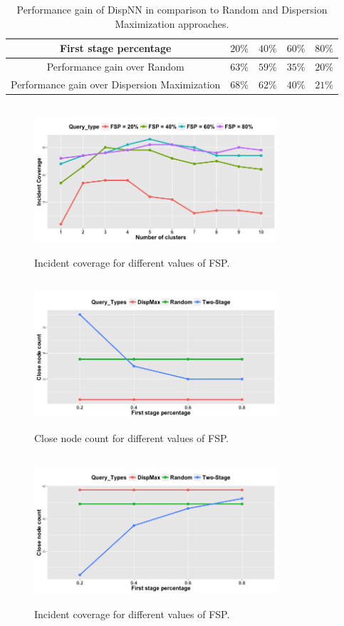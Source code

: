 \documentclass{acm_proc_article-sp}
\begin{document}
\begin{table}[!h]
\centering
\begin{tabulary}{0.5\textwidth}{|C|C|C|C|C|}
\hline
First stage percentage & $20\%$ & $40\%$  & $60\%$  & $80\%$  \\ \hline
Performance gain over Random   & $63\%$ & $59\%$  & $35\%$  & $20\%$  \\ \hline
Performance gain over Dispersion Maximization   & $68\%$ & $62\%$  & $40\%$  & $21\%$ \\ \hline
\end{tabulary}
\caption{Performance gain of DispNN in comparison to Random and Dispersion Maximization approaches.}
\label{table:clusteredSurge}
\end{table}


\begin{figure}[!h]
\centering
\includegraphics[width=9cm ,height=5.5cm]{figuresPng/Coverage_Result.png}
\caption{Incident coverage for different values of FSP. }
\label{fig: clustCoverage}
\end{figure}

\begin{figure}[!h]
\centering
\includegraphics[width=9cm ,height=5.5cm]{figuresPng/Uni_ClosePeople_Count.png}
\caption{Close node count for different values of FSP. }
\label{fig:uniClosePeople}
\end{figure}
\begin{figure}[!h]
\centering
\includegraphics[width=9cm ,height=5.5cm]{figuresPng/Uni-Inc_Coverage.png}
\caption{Incident coverage for different values of FSP. }
\label{fig:uniIncdCove}
\end{figure}
\end{document}
